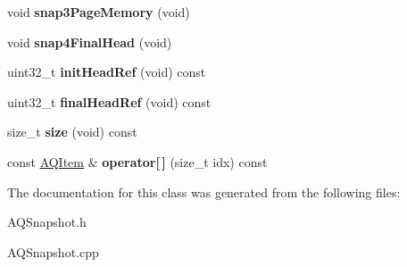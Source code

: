 \begin{DoxyCompactItemize}
\item 
void {\bfseries snap3\+Page\+Memory} (void)\hypertarget{class_a_q_snapshot_af6678e323b473546ff0c3897eee9c9a4}{}\label{class_a_q_snapshot_af6678e323b473546ff0c3897eee9c9a4}

\item 
void {\bfseries snap4\+Final\+Head} (void)\hypertarget{class_a_q_snapshot_ad9441788c37ebc61eedd38a5bd05aa01}{}\label{class_a_q_snapshot_ad9441788c37ebc61eedd38a5bd05aa01}

\item 
uint32\+\_\+t {\bfseries init\+Head\+Ref} (void) const \hypertarget{class_a_q_snapshot_a5ee63bb9f5ef210057ffdfaa61b1875d}{}\label{class_a_q_snapshot_a5ee63bb9f5ef210057ffdfaa61b1875d}

\item 
uint32\+\_\+t {\bfseries final\+Head\+Ref} (void) const \hypertarget{class_a_q_snapshot_a22e3bcff55f5739df18a2db3e13180e9}{}\label{class_a_q_snapshot_a22e3bcff55f5739df18a2db3e13180e9}

\item 
size\+\_\+t {\bfseries size} (void) const \hypertarget{class_a_q_snapshot_a951996216da0d1fc84f9d923620ba1af}{}\label{class_a_q_snapshot_a951996216da0d1fc84f9d923620ba1af}

\item 
const \hyperlink{class_a_q_item}{A\+Q\+Item} \& {\bfseries operator\mbox{[}$\,$\mbox{]}} (size\+\_\+t idx) const \hypertarget{class_a_q_snapshot_ad2b0f8616beab3e8fd012031a712bd0a}{}\label{class_a_q_snapshot_ad2b0f8616beab3e8fd012031a712bd0a}

\end{DoxyCompactItemize}


The documentation for this class was generated from the following files\+:\begin{DoxyCompactItemize}
\item 
A\+Q\+Snapshot.\+h\item 
A\+Q\+Snapshot.\+cpp\end{DoxyCompactItemize}
